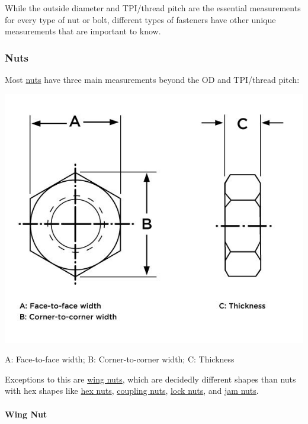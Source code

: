 \documentclass[12pt, a4paper]{article}
\let\oldparagraph\paragraph
\renewcommand{\paragraph}[1]{\oldparagraph{#1}\mbox{}}
\begin{document}
		\hypertarget{i7aa4wx}{}
		While the outside diameter and TPI/thread pitch are the essential
		measurements for every type of nut or bolt, different types of fasteners
		have other unique measurements that are important to know.
		
		\hypertarget{ifa94lv}{%
			\subsubsection{Nuts}\label{ifa94lv}}
		
		\hypertarget{if13qfk}{}
		Most \href{https://www.huyett.com/all-products/nuts}{nuts} have three
		main measurements beyond the OD and TPI/thread pitch:
		
		\includegraphics{Introduction to Nut and Bolt Sizes_files/6307bb72dbb49891453363.jpg}
		
		\hypertarget{ijs7afj}{}
		A: Face-to-face width; B: Corner-to-corner width; C: Thickness
		
		\hypertarget{isfuo09}{}
		Exceptions to this are
		\href{https://www.huyett.com/all-products/nuts/wing-nuts}{wing nuts},
		which are decidedly different shapes than nuts with hex shapes like
		\href{https://www.huyett.com/all-products/nuts/hex-nuts}{hex nuts},
		\href{https://www.huyett.com/all-products/nuts/coupling-nuts}{coupling
			nuts}, \href{https://www.huyett.com/all-products/nuts/lock-nuts}{lock
			nuts}, and
		\href{https://www.huyett.com/all-products/nuts/lock-nuts/jam-lock-nuts}{jam
			nuts}.
		
		\hypertarget{ipyz34t}{%
			\paragraph{Wing Nut}\label{ipyz34t}}
		
\end{document}
